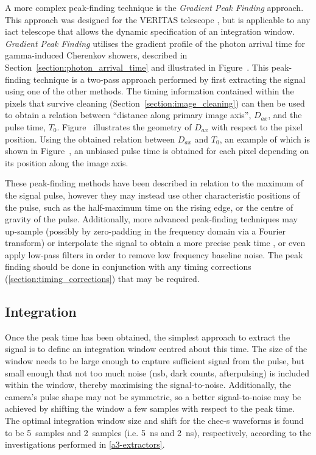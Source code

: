  A more complex peak-finding technique is the \textit{Gradient Peak Finding} approach. This approach was designed for the VERITAS telescope \cite{Holder2005}\cite{Cogan2006}\cite{Cogan2007}, but is applicable to any \gls{iact} telescope that allows the dynamic specification of an integration window. \textit{Gradient Peak Finding} utilises the gradient profile of the photon arrival time for gamma-induced Cherenkov showers, described in Section~\ref{section:photon_arrival_time} and illustrated in Figure~. This peak-finding technique is a two-pass approach performed by first extracting the signal using one of the other methods. The timing information contained within the pixels that survive cleaning (Section~\ref{section:image_cleaning}) can then be used to obtain a relation between ``distance along primary image axis'', $D_{ax}$, and the pulse time, $T_0$. Figure~ illustrates the geometry of $D_{ax}$ with respect to the pixel position. Using the obtained relation between $D_{ax}$ and $T_0$, an example of which is shown in Figure~, an unbiased pulse time is obtained for each pixel depending on its position along the image axis.

These peak-finding methods have been described in relation to the maximum of the signal pulse, however they may instead use other characteristic positions of the pulse, such as the half-maximum time on the rising edge, or the centre of gravity of the pulse. Additionally, more advanced peak-finding techniques may up-sample (possibly by zero-padding in the frequency domain via a Fourier transform) or interpolate the signal to obtain a more precise peak time \cite{Cogan2006, Cogan2007}, or even apply low-pass filters in order to remove low frequency baseline noise. The peak finding should be done in conjunction with any timing corrections (\ref{section:timing_corrections}) that may be required.

\subsection{Integration}

Once the peak time has been obtained, the simplest approach to extract the signal is to define an integration window centred about this time. The size of the window needs to be large enough to capture sufficient signal from the pulse, but small enough that not too much noise (\gls{nsb}, dark counts, afterpulsing) is included within the window, thereby maximising the signal-to-noise. Additionally, the camera's pulse shape may not be symmetric, so a better signal-to-noise may be achieved by shifting the window a few samples with respect to the peak time. The optimal integration window size and shift for the \gls{chec-s} waveforms is found to be \SI{5}{samples} and \SI{2}{samples} (i.e. \SI{5}{ns} and \SI{2}{ns}), respectively, according to the investigations performed in \ref{a3-extractors}.

